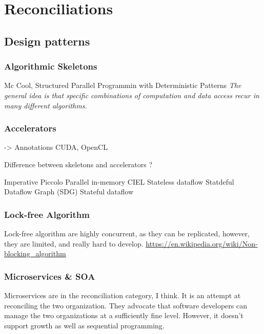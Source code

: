 \section{Reconciliations}




\subsection{Design patterns}

\subsubsection{Algorithmic Skeletons}
\cite{McCool2010} Mc Cool, Structured Parallel Programmin with Deterministic Patterns
\textit{The general idea is that specific combinations of computation and data access recur in many different algorithms.}

\subsubsection{Accelerators} -> Annotations
CUDA, OpenCL


Difference between skeletons and accelerators ?

Imperative
  Piccolo      Parallel in-memory \cite{Power2010}
  CIEL         Stateless dataflow \cite{Murray2011}
  Statdeful Dataflow Graph (SDG)          Stateful dataflow  \cite{Fernandez2014a}



\subsubsection{Lock-free Algorithm}

Lock-free algorithm are highly concurrent, as they can be replicated, however, they are limited, and really hard to develop.
\url{https://en.wikipedia.org/wiki/Non-blocking_algorithm}

\subsubsection{Microservices \& SOA}

Microservices are in the reconciliation category, I think.
It is an attempt at reconciling the two organization. 
They advocate that software developers can manage the two organizations at a sufficiently fine level.
However, it doesn't support growth as well as sequential programming.



